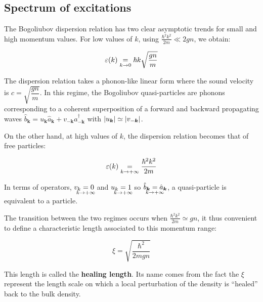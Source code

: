 \subsection{Spectrum of excitations}
\label{sec:spectrum}

The Bogoliubov dispersion relation has two clear asymptotic trends for small and high momentum values. For low values of $k$, using $\frac{\hbar^2 k^2}{2m} \ll 2gn$, we obtain:

\begin{equation}
    \varepsilon(k) \underrel{k \to 0}{=} \hbar k \sqrt{\frac{gn}{m}}
\end{equation}

\noindent The dispersion relation takes a phonon-like linear form where the sound velocity is $c=\sqrt{\dfrac{gn}{m}}$. In this regime, the Bogoliubov quasi-particles are phonons corresponding to a coherent superposition of a forward and backward propagating waves $\hat{b}_{\bm{k}}=u_{\bm{k}} \hat{a}_{\bm{k}} + v_{-\bm{k}} \hat{a}^{\dagger}_{-\bm{k}}$ with $\left\lvert u_{\bm{k}}\right\rvert \simeq \left\lvert v_{-\bm{k}}\right\rvert$.

On the other hand, at high values of $k$, the dispersion relation becomes that of free particles:

\begin{equation}
    \varepsilon(k) \underrel{k \to +\infty}{=} \frac{\hbar^2 k^2}{2m}
\end{equation}

\noindent In terms of operators, $v_k \underrel[c]{k \to +\infty}{=} 0$ and $u_k \underrel[c]{k \to +\infty}{=} 1$ so $\hat{b}_{\bm{k}}\underrel[c]{k \to +\infty}{=}\hat{a}_{\bm{k}}$, a quasi-particle is equivalent to a particle. 

The transition between the two regimes occurs when $\frac{\hbar^2 k^2}{2m} \simeq gn$, it thus convenient to define a characteristic length associated to this momentum range:

\begin{equation}
    \xi = \sqrt{\frac{\hbar^2}{2mgn}}
\end{equation}

\noindent This length is called the \textbf{healing length}. Its name comes from the fact the $\xi$ represent the length scale on which a local perturbation of the density is ``healed'' back to the bulk density.


